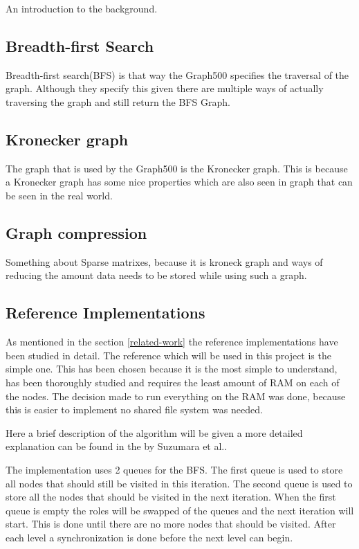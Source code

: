 An introduction to the background.

\subsection{Breadth-first Search}
Breadth-first search(BFS) is that way the Graph500 specifies the traversal of the graph. Although they specify this given there are multiple ways of actually traversing the graph and still return the BFS Graph.


\subsection{Kronecker graph}
The graph that is used by the Graph500 is the Kronecker graph\cite{leskovec2010kronecker}. This is because a Kronecker graph has some nice properties which are also seen in graph that can be seen in the real world.

\subsection{Graph compression}
Something about Sparse matrixes, because it is kroneck graph and ways of reducing the amount data needs to be stored while using such a graph.

\subsection{Reference Implementations}
As mentioned in the section \ref{related-work} the reference implementations have been studied in detail. The reference which will be used in this project is the  simple one. This has been chosen because it is the most simple to understand, has been thoroughly studied and requires the least amount of RAM on each of the nodes. The decision made to run everything on the RAM was done, because this is easier to implement no shared file system was needed. 

Here a brief description of the algorithm will be given a more detailed explanation can be found in the by Suzumara et al.\cite{suzumura2011performance}.
 
The implementation uses 2 queues for the BFS. The first queue is used to store all nodes that should still be visited in this iteration. The second queue is used to store all the nodes that should be visited in the next iteration. When the first queue is empty the roles will be swapped of the queues and the next iteration will start. This is done until there are no more nodes that should be visited.
After each level a synchronization is done before the next level can begin. 

